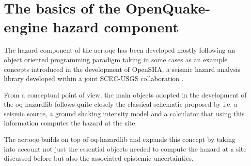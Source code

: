 \section{The basics of the OpenQuake-engine hazard component}
%
The hazard component of the \gls{acr:oqe} has been developed mostly following 
an object oriented programming paradigm taking in some cases as an example 
concepts introduced in the development of OpenSHA, a seismic hazard 
analysis library developed within a joint SCEC-USGS collaboration 
\parencite{field2003}. 

From a conceptual point of view, the main objects adopted in the development
of the oq-hazardlib follows quite closely the classical schematic proposed by
\textcite{reiter1991} i.e. a seismic source, a ground shaking intensity model 
and a calculator that using this information computes the hazard at the site.

The \gls{acr:oqe} builds on top of oq-hazardlib and expands this 
concept by taking into account not just the essential objects 
needed to compute the hazard at a site discussed before but 
also the associated epistemic uncertainties.
%
